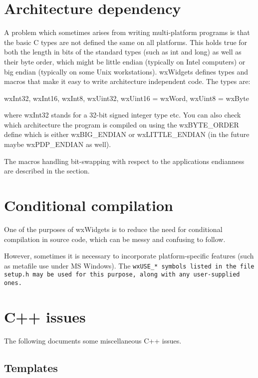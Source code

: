 \section{Architecture dependency}\label{architecturedependency}

A problem which sometimes arises from writing multi-platform programs is that
the basic C types are not defined the same on all platforms. This holds true
for both the length in bits of the standard types (such as int and long) as 
well as their byte order, which might be little endian (typically
on Intel computers) or big endian (typically on some Unix workstations). wxWidgets
defines types and macros that make it easy to write architecture independent
code. The types are:

wxInt32, wxInt16, wxInt8, wxUint32, wxUint16 = wxWord, wxUint8 = wxByte

where wxInt32 stands for a 32-bit signed integer type etc. You can also check
which architecture the program is compiled on using the wxBYTE\_ORDER define
which is either wxBIG\_ENDIAN or wxLITTLE\_ENDIAN (in the future maybe wxPDP\_ENDIAN
as well).

The macros handling bit-swapping with respect to the applications endianness
are described in the  section.

\section{Conditional compilation}\label{conditionalcompilation}

One of the purposes of wxWidgets is to reduce the need for conditional
compilation in source code, which can be messy and confusing to follow.

However, sometimes it is necessary to incorporate platform-specific
features (such as metafile use under MS Windows). The \tt{wxUSE\_*} symbols
listed in the file {\tt setup.h} may be used for this purpose,
along with any user-supplied ones.

\section{C++ issues}\label{cpp}

The following documents some miscellaneous C++ issues.

\subsection{Templates}\label{templates}

